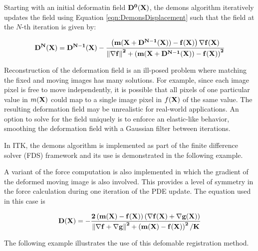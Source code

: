 Starting with an initial deformatin field $\bf{D}^{0}(\bf{X})$, the demons
algorithm iteratively updates the field using Equation
\ref{eqn:DemonsDisplacement} such that the field at the $N$-th iteration is
given by:

\begin{equation}
\bf{D}^{N}(\bf{X}) = \bf{D}^{N-1}(\bf{X}) - \frac
{\left(  m(\bf{X}+ \bf{D}^{N-1}(\bf{X})) 
- f(\bf{X}) \right) \nabla f(\bf{X})}
{\left\|  \nabla f \right\|^2 + \left(  
m(\bf{X}+ \bf{D}^{N-1}(\bf{X}) )
 - f(\bf{X}) \right)^2 } 
\label{eqn:DemonsUpdateEquation}
\end{equation}

Reconstruction of the deformation field is an ill-posed problem where
matching the fixed and moving images has many solutions. For example, since
each image pixel is free to move independently, it is possible that all
pixels of one particular value in $m(\bf{X})$ could map to a single image
pixel in $f(\bf{X})$ of the same value. The resulting deformation field may
be unrealistic for real-world applications. An option to solve for the field
uniquely is to enforce an elastic-like behavior, smoothing the deformation
field with a Gaussian filter between iterations.

In ITK, the demons algorithm is implemented as part of the finite difference
solver (FDS) framework and its use is demonstrated in the following example.

 

A variant of the force computation is also implemented in which the gradient of
the deformed moving image is also involved. This provides a level of symmetry
in the force calculation during one iteration of the PDE update. The equation
used in this case is

\begin{equation}
\bf{D}(\bf{X}) = - \frac
{2 \left(  m(\bf{X}) - f(\bf{X}) \right) \left(  \nabla f(\bf{X}) +  \nabla g(\bf{X}) \right) }
{\left\|  \nabla f + \nabla g \right\|^2 + \left(  m(\bf{X}) - f(\bf{X}) \right)^2 / K } 
\label{eqn:DemonsDisplacement2}
\end{equation}

The following example illustrates the use of this defomable registration
method.

 



